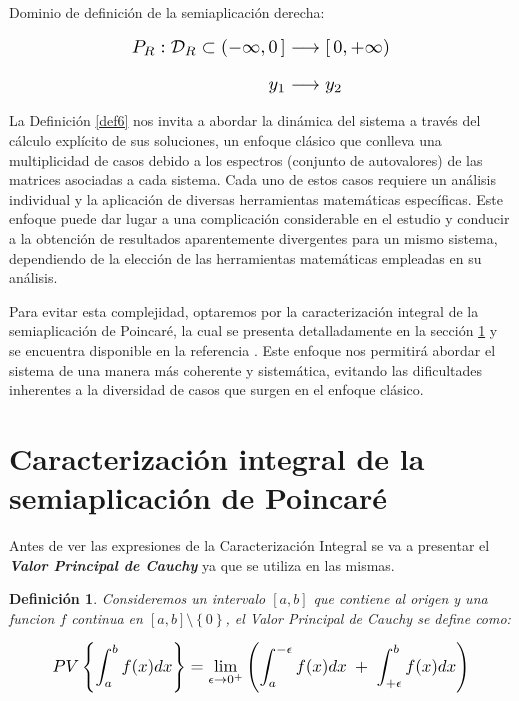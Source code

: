 \documentclass[12pt,a4paper]{report} %
\newtheorem{definicion}{Definición}[chapter]
\newtheorem{definicion}{Definición}[chapter] %
\begin{document}
	\vspace{0.5cm}Dominio de definición de la semiaplicación derecha:
	
	\vspace{0.5cm}
	
	\begin{equation}
		\label{eq:dr}
		\scalebox{1.3}{$\displaystyle
			\begin{aligned}
				P_R:\mathcal{D}_R\subset (-\infty,0\,] &\longrightarrow [\,0, +\infty)\\[2mm]
				y_1 &\longrightarrow y_2
			\end{aligned}
			$}
	\end{equation}
	
	\vspace{0.5cm}La Definición \ref{def6} nos invita a abordar la dinámica del sistema a través del cálculo explícito de sus soluciones, un enfoque clásico que conlleva una multiplicidad de casos debido a los espectros (conjunto de autovalores) de las matrices asociadas a cada sistema. Cada uno de estos casos requiere un análisis individual y la aplicación de diversas herramientas matemáticas específicas. Este enfoque puede dar lugar a una complicación considerable en el estudio y conducir a la obtención de resultados aparentemente divergentes para un mismo sistema, dependiendo de la elección de las herramientas matemáticas empleadas en su análisis.
	
	\vspace{0.5cm}\noindent Para evitar esta complejidad, optaremos por la caracterización integral de la semiaplicación de Poincaré, la cual se presenta detalladamente en la sección \ref{sec41} y se encuentra disponible en la referencia \cite{caracterizacion}. Este enfoque nos permitirá abordar el sistema de una manera más coherente y sistemática, evitando las dificultades inherentes a la diversidad de casos que surgen en el enfoque clásico.
	\newpage
	
	\section{Caracterización integral de la semiaplicación de Poincaré}
	\label{sec41}
	
	\vspace{0.5cm} Antes de ver las expresiones de la Caracterización Integral se va a presentar el \textit{\textbf{Valor Principal de Cauchy}} ya que se utiliza en las mismas.
	\begin{definicion}
	
	 Consideremos un intervalo $[a,b]$ que contiene al origen y una funcion $f$ continua en $[a,b] \setminus \left\{0\right\}$, el Valor Principal de Cauchy se define como:
	
	\begin{equation}
		\scalebox{1.2}{$\displaystyle
			PV\left\{\int_{a}^{b}f(x)dx\right\}= \lim_{\epsilon \to 0^+}\left(
			\int_{a}^{-\epsilon}f(x)dx \; + \; 
			\int_{+\epsilon}^{b}f(x)dx
			\right)
			$}
	\end{equation}\smallskip
	
    \end{definicion}
    
\end{document}
